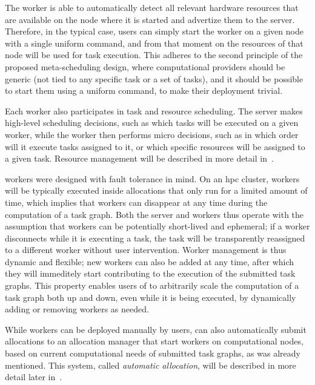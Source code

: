The worker is able to automatically detect all relevant hardware resources that are available on
the node where it is started and advertize them to the server. Therefore, in the typical case,
users can simply start the worker on a given node with a single uniform command, and from that
moment on the resources of that node will be used for task execution. This adheres to the second
principle of the proposed meta-scheduling design, where computational providers should be generic
(not tied to any specific task or a set of tasks), and it should be possible to start them using a
uniform command, to make their deployment trivial.

Each worker also participates in task and resource scheduling. The server makes high-level
scheduling decisions, such as which tasks will be executed on a given worker, while the worker then
performs micro decisions, such as in which order will it execute tasks assigned to it, or which
specific resources will be assigned to a given task. Resource management will be described in more
detail in~.

\hyperqueue{} workers were designed with fault tolerance in mind. On an
\gls{hpc}
cluster, workers will be typically executed inside allocations that only run for a limited amount
of time, which implies that workers can disappear at any time during the computation of a task
graph. Both the server and workers thus operate with the assumption that workers can be potentially
short-lived and ephemeral; if a worker disconnects while it is executing a task, the task will be
transparently reassigned to a different worker without user intervention. Worker management is thus
dynamic and flexible; new workers can also be added at any time, after which they will immeditely
start contributing to the execution of the submitted task graphs. This property enables users of
\hq{} to arbitrarily scale the computation of a task graph both up and down, even
while it is being executed, by dynamically adding or removing workers as needed.

While workers can be deployed manually by users, \hq{} can also automatically
submit allocations to an allocation manager that start workers on computational nodes, based on
current computational needs of submitted task graphs, as was already mentioned. This system, called
\emph{automatic allocation}, will be described in more detail later in~.

